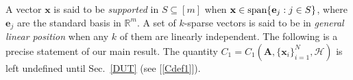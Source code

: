 \documentclass[9pt,twocolumn]{pnas-new}
\renewcommand{\eqref}[1]{\textnormal{[\ref{#1}]}}
\begin{document}
A vector $\mathbf{x}$ is said to be \emph{supported} in $S \subseteq [m]$ when $\mathbf{x} \in \text{\rm span}\{\mathbf{e}_j: j\in S\}$, where $\mathbf{e}_j$ are the standard basis in $\mathbb R^m$. 
A set of $k$-sparse vectors is said to be in \emph{general linear position} when any $k$ of them are linearly independent. The following is a precise statement of our main result.  The quantity $C_1 = C_1(\mathbf{A}, \{\mathbf{x}_i\}_{i=1}^N, \mathcal{H})$ is left undefined until Sec.~\ref{DUT} (see \eqref{Cdef1}).
% 
\end{document}

